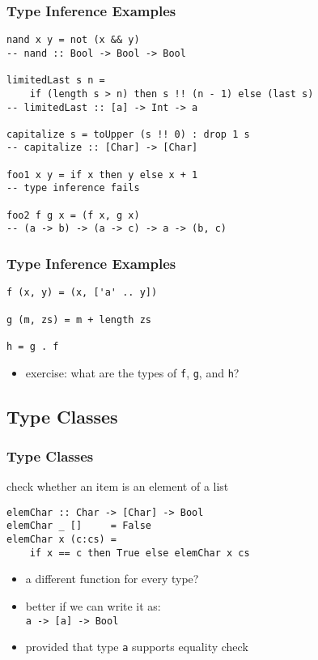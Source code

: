 \documentclass[dvipsnames]{beamer}
\theoremstyle{plain}
\begin{document}
\begin{frame}[fragile]
  \frametitle{Type Inference Examples}

  \begin{lstlisting}
nand x y = not (x && y)
-- nand :: Bool -> Bool -> Bool

limitedLast s n =
    if (length s > n) then s !! (n - 1) else (last s)
-- limitedLast :: [a] -> Int -> a

capitalize s = toUpper (s !! 0) : drop 1 s
-- capitalize :: [Char] -> [Char]

foo1 x y = if x then y else x + 1
-- type inference fails

foo2 f g x = (f x, g x)
-- (a -> b) -> (a -> c) -> a -> (b, c)
  \end{lstlisting}

\end{frame}

\begin{frame}[fragile]
  \frametitle{Type Inference Examples}

  \begin{lstlisting}
f (x, y) = (x, ['a' .. y])

g (m, zs) = m + length zs

h = g . f
  \end{lstlisting}

  \medskip
  \begin{itemize}
    \item exercise: what are the types of \lstinline|f|, \lstinline|g|,
      and \lstinline|h|?
  \end{itemize}
\end{frame}

\subsection{Type Classes}

\begin{frame}[fragile]
  \frametitle{Type Classes}

  \begin{exampleblock}{check whether an item is an element of a list}
    \begin{lstlisting}
elemChar :: Char -> [Char] -> Bool
elemChar _ []     = False
elemChar x (c:cs) =
    if x == c then True else elemChar x cs
    \end{lstlisting}
  \end{exampleblock}

  \pause
  \begin{itemize}
    \item a different function for every type?
    \item better if we can write it as:\\
      \lstinline|a -> [a] -> Bool|
    \item provided that type \lstinline|a| supports equality check
  \end{itemize}
\end{frame}
\end{document}
